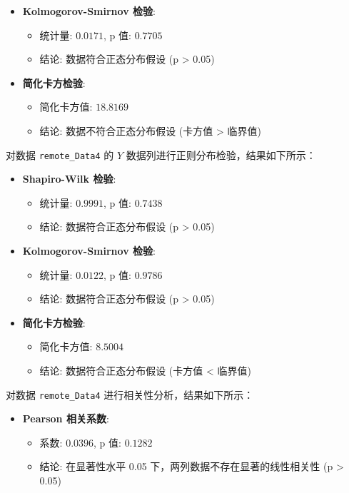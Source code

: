 \begin{enumerate}
\begin{enumerate}
\begin{itemize}
			\item \textbf{Kolmogorov-Smirnov 检验}:
			\begin{itemize}
				\item 统计量: \(0.0171\), p 值: \(0.7705\)
				\item 结论: 数据符合正态分布假设 (p > 0.05)
			\end{itemize}
			
			\item \textbf{简化卡方检验}:
			\begin{itemize}
				\item 简化卡方值: \(18.8169\)
				\item 结论: 数据不符合正态分布假设 (卡方值 > 临界值)
			\end{itemize}
		\end{itemize}
		
		对数据 \texttt{remote\_Data4} 的 \(Y\) 数据列进行正则分布检验，结果如下所示：
		
		\begin{itemize}
			\item \textbf{Shapiro-Wilk 检验}:
			\begin{itemize}
				\item 统计量: \(0.9991\), p 值: \(0.7438\)
				\item 结论: 数据符合正态分布假设 (p > 0.05)
			\end{itemize}
			
			\item \textbf{Kolmogorov-Smirnov 检验}:
			\begin{itemize}
				\item 统计量: \(0.0122\), p 值: \(0.9786\)
				\item 结论: 数据符合正态分布假设 (p > 0.05)
			\end{itemize}
			
			\item \textbf{简化卡方检验}:
			\begin{itemize}
				\item 简化卡方值: \(8.5004\)
				\item 结论: 数据符合正态分布假设 (卡方值 < 临界值)
			\end{itemize}
		\end{itemize}
		
		对数据 \texttt{remote\_Data4} 进行相关性分析，结果如下所示：
		
		\begin{itemize}
			\item \textbf{Pearson 相关系数}:
			\begin{itemize}
				\item 系数: \(0.0396\), p 值: \(0.1282\)
				\item 结论: 在显著性水平 0.05 下，两列数据不存在显著的线性相关性 (p > 0.05)
			\end{itemize}
			

\end{itemize}
\end{enumerate}
\end{enumerate}
